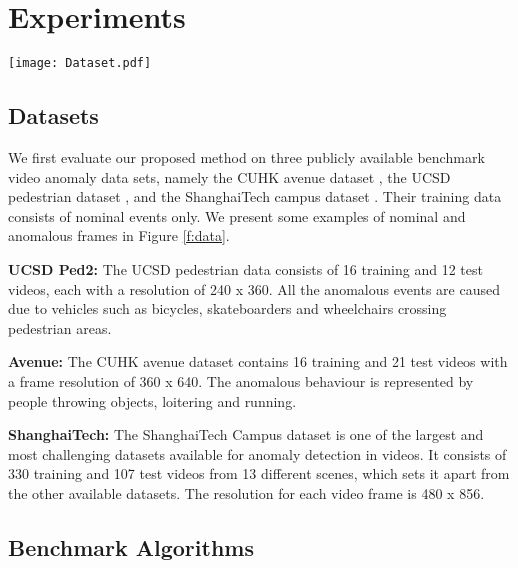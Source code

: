 \section{Experiments}
\begin{figure*}[th]
\centering
\texttt{[image: Dataset.pdf]}
\vspace{-2mm}
\caption{Examples of nominal and anomalous frames in the UCSD Ped2, CUHK Avenue and ShanghaiTech datasets. Anomalous events are shown with red box.}
\label{f:data}
\vspace{-2mm}
\end{figure*}


\label{s:experiments}

\subsection{Datasets}

We first evaluate our proposed method on three publicly available benchmark video anomaly data sets, namely the CUHK avenue dataset \cite{lu2013abnormal}, the UCSD pedestrian dataset \cite{mahadevan2010anomaly}, and the ShanghaiTech campus dataset \cite{luo2017revisit}. Their training data consists of nominal events only. We present some examples of nominal and anomalous frames in Figure \ref{f:data}. 

\textbf{UCSD Ped2:} The UCSD pedestrian data consists of 16 training and 12 test videos, each with a resolution of 240 x 360. All the anomalous events are caused due to vehicles such as bicycles, skateboarders and wheelchairs crossing pedestrian areas. 

\textbf{Avenue:} The CUHK avenue dataset contains 16 training and 21 test videos with a frame resolution of 360 x 640. The anomalous behaviour is represented by people throwing objects, loitering and running. 

\textbf{ShanghaiTech:} The ShanghaiTech Campus dataset is one of the largest and most challenging datasets available for anomaly detection in videos. It consists of 330 training and 107 test videos from 13 different scenes, which sets it apart from the other available datasets. The resolution for each video frame is 480 x 856. 

\subsection{Benchmark Algorithms}


